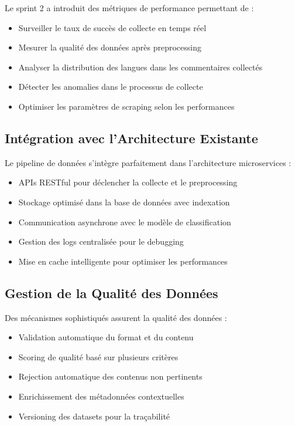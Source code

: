 Le sprint 2 a introduit des métriques de performance permettant de :
\begin{itemize}
    \item Surveiller le taux de succès de collecte en temps réel
    \item Mesurer la qualité des données après preprocessing
    \item Analyser la distribution des langues dans les commentaires collectés
    \item Détecter les anomalies dans le processus de collecte
    \item Optimiser les paramètres de scraping selon les performances
\end{itemize}

\subsection{Intégration avec l'Architecture Existante}

Le pipeline de données s'intègre parfaitement dans l'architecture microservices :
\begin{itemize}
    \item APIs RESTful pour déclencher la collecte et le preprocessing
    \item Stockage optimisé dans la base de données avec indexation
    \item Communication asynchrone avec le modèle de classification
    \item Gestion des logs centralisée pour le debugging
    \item Mise en cache intelligente pour optimiser les performances
\end{itemize}

\subsection{Gestion de la Qualité des Données}

Des mécanismes sophistiqués assurent la qualité des données :
\begin{itemize}
    \item Validation automatique du format et du contenu
    \item Scoring de qualité basé sur plusieurs critères
    \item Rejection automatique des contenus non pertinents
    \item Enrichissement des métadonnées contextuelles
    \item Versioning des datasets pour la traçabilité
\end{itemize}

